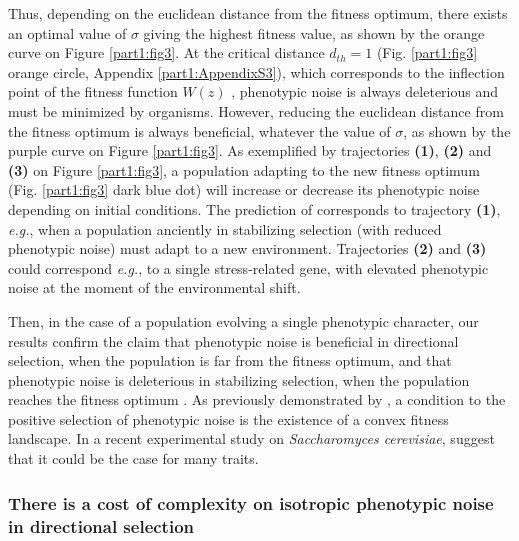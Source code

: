 Thus, depending on the euclidean distance from the fitness optimum, there exists an optimal value of $\sigma$ giving the highest fitness value, as shown by the orange curve on Figure \ref{part1:fig3}. At the critical distance $d_{th} = 1$ (Fig. \ref{part1:fig3} orange circle, Appendix \ref{part1:AppendixS3}), which corresponds to the inflection point of the fitness function $W(z)$ \citep{zhang-et-al-2009}, phenotypic noise is always deleterious and must be minimized by organisms. However, reducing the euclidean distance from the fitness optimum is always beneficial, whatever the value of $\sigma$, as shown by the purple curve on Figure \ref{part1:fig3}. As exemplified by trajectories \textbf{(1)}, \textbf{(2)} and \textbf{(3)} on Figure \ref{part1:fig3}, a population adapting to the new fitness optimum (Fig. \ref{part1:fig3} dark blue dot) will increase or decrease its phenotypic noise depending on initial conditions. The prediction of \cite{eldar-and-elowitz-2010} corresponds to trajectory \textbf{(1)}, \textit{e.g.}, when a population anciently in stabilizing selection (with reduced phenotypic noise) must adapt to a new environment. Trajectories \textbf{(2)} and \textbf{(3)} could correspond \textit{ e.g.}, to a single stress-related gene, with elevated phenotypic noise at the moment of the environmental shift.

Then, in the case of a population evolving a single phenotypic character, our results confirm the claim that phenotypic noise is beneficial in directional selection, when the population is far from the fitness optimum, and that phenotypic noise is deleterious in stabilizing selection, when the population reaches the fitness optimum \citep{eldar-and-elowitz-2010}. As previously demonstrated by \cite{zhang-et-al-2009}, a condition to the positive selection of phenotypic noise is the existence of a convex fitness landscape. In a recent experimental study on \textit{Saccharomyces cerevisiae}, \cite{keren-et-al-2016} suggest that it could be the case for many traits.


\subsubsection{There is a cost of complexity on isotropic phenotypic noise in directional selection}

